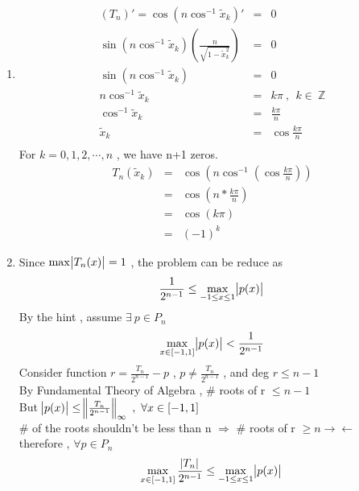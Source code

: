 \documentclass[12pt]{article}
\begin{document}
\begin{enumerate}
\begin{enumerate}
            \item %
            \begin{eqnarray*}
            (T_n)'=\cos(n\cos^{-1}\tilde{x}_k)'&=&0\\
            \sin(n\cos^{-1}\tilde{x}_k)(\frac{n}{\sqrt{1-\tilde{x}_k^2}})&=&0\\
            \sin(n\cos^{-1}\tilde{x}_k)&=&0\\
            n\cos^{-1}\tilde{x}_k&=&k\pi\ ,\ \ k\in\ \mathbb{Z}\\
            \cos^{-1}\tilde{x}_k&=&\frac{k\pi}{n}\\
            \tilde{x}_k&=&\cos\frac{k\pi}{n}\\            
            \end{eqnarray*}
            For $k=0,1,2,\cdots,n$ , we have n+1 zeros.
            \begin{eqnarray*}
                T_n(\tilde{x}_k)&=&\cos(n\cos^{-1}(\cos\frac{k\pi}{n}))\\
                &=&\cos(n*\frac{k\pi}{n})\\
                &=&\cos(k\pi)\\
                &=&(-1)^k
            \end{eqnarray*}
            
            \item %
            Since $\max\abs{T_n(x)}=1$ , the problem can be reduce as
            \begin{equation*}
                \frac{1}{2^{n-1}}\le\max_{-1\le x\le1}\abs{p(x)}\\
            \end{equation*}
            By the hint , assume $\exists\  p \in P_n$
            \begin{equation*}
            \max_{x\in[-1,1]}\abs{p(x)} < \frac{1}{2^{n-1}}\\
            \end{equation*}
            Consider function $r=\frac{T_n}{2^{n-1}}-p$ , $p\not=\frac{T_n}{2^{n-1}}$ , and deg $r\le n-1$\\
            By Fundamental Theory of Algebra , \# roots of r $\le n-1$\\
            But $\abs{p(x)}\le\norm{\frac{T_n}{2^{n-1}}}_\infty\ ,\ \forall x\in [-1,1]$\\
            \# of the roots shouldn't be less than n $\Rightarrow$ \# roots of r $\ge n \rightarrow\leftarrow$\\
            therefore , $\forall p \in P_n$\\
            \begin{equation*}
                \max_{x\in[-1,1]}\frac{\abs{T_n}}{2^{n-1}}\le\max_{-1\le x\le1}\abs{p(x)}\\
            \end{equation*}
            

\end{enumerate}
\end{enumerate}
\end{document}
